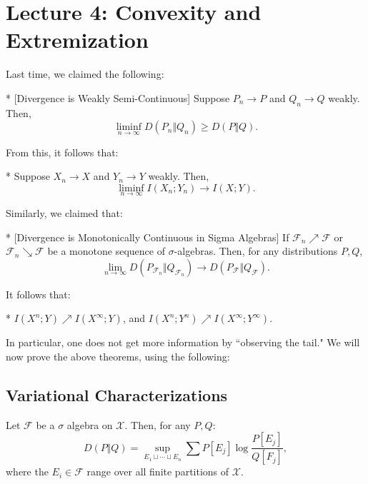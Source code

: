 \section*{Lecture 4: Convexity and Extremization}
\setcounter{section}{4}
\setcounter{subsection}{0}
\setcounter{defn}{0}
\setcounter{defncontainer}{0}

Last time, we claimed the following:

\begin{thm}*
	\label{dwsc}
	[Divergence is Weakly Semi-Continuous]
	Suppose $P_n \to P$ and $Q_n\to Q$ weakly.
	Then, \[
		\liminf_{n\to \infty} D(P_n\Vert Q_n) \geq D(P\Vert Q).
	\]
\end{thm}

From this, it follows that:

\begin{cor}*
	Suppose $X_n\to X$ and $Y_n\to Y$ weakly. 
	Then, \[
		\liminf_{n\to \infty} I(X_n;Y_n) \to I(X;Y).
	\]
\end{cor}

Similarly, we claimed that:

\begin{thm}*
	\label{dmcsa}
	[Divergence is Monotonically Continuous in Sigma Algebras]
	If $\mathcal F_n \nearrow \mathcal F$ or $\mathcal F_n \searrow \mathcal F$ be a monotone sequence of $\sigma$-algebras. Then, for any distributions $P, Q$, \[
		\lim_{n\to \infty} D(P_{\mathcal F_n}\Vert Q_{\mathcal F_n}) \to D(P_{\mathcal F}\Vert Q_{\mathcal F}).
	\]
\end{thm}

It follows that:

\begin{cor}*
	$I(X^n;Y) \nearrow I(X^\infty;Y)$, and $I(X^n;Y^n) \nearrow I(X^\infty;Y^\infty)$. 
\end{cor}

In particular, one does not get more information by ``observing the tail."
We will now prove the above theorems, using the following:

\subsection{Variational Characterizations}

\begin{thm}
	Let $\mathcal F$ be a $\sigma$ algebra on $\mathcal X$. Then, for any $P,Q$: \[
		D(P\Vert Q) = \sup_{E_1\sqcup \cdots \sqcup E_n}\sum P[E_j] \log \frac{P[E_j]}{Q[F_j]},
	\]
	where the $E_i\in\mathcal F$ range over all finite partitions of $\mathcal X$.
\end{thm}

